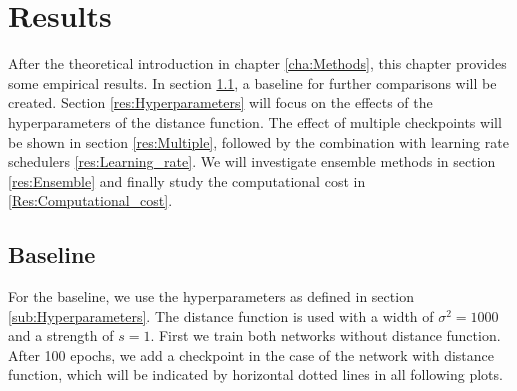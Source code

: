 \chapter{Results}

After the theoretical introduction in chapter \ref{cha:Methods}, this chapter
provides some empirical results. In section \ref{res:Baseline}, a baseline for
further comparisons will be created. Section \ref{res:Hyperparameters} will
focus on the effects of the hyperparameters of the distance function. The effect
of multiple checkpoints will be shown in section \ref{res:Multiple}, followed by
the combination with learning rate schedulers \ref{res:Learning_rate}. We will
investigate ensemble methods in section \ref{res:Ensemble} and
finally study the computational cost in \ref{Res:Computational_cost}.
\pagebreak


\section{Baseline}\label{res:Baseline} For the baseline, we use the
hyperparameters as defined in section \ref{sub:Hyperparameters}. The distance
function is used with a width of $\sigma^2=1000$ and a strength of $s=1$. First
we train both networks without distance function. After 100 epochs, we add a
checkpoint in the case of the network with distance function, which will be
indicated by horizontal dotted lines in all following plots.

